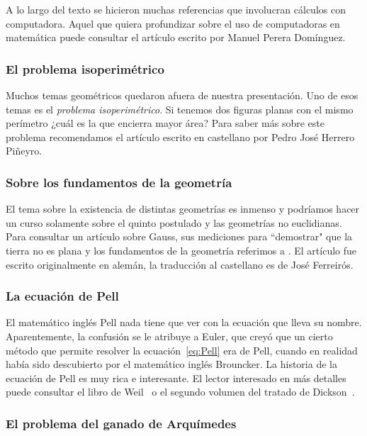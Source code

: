 A lo largo del texto se hicieron muchas referencias que involucran cálculos
con computadora. Aquel que quiera profundizar sobre 
el uso de computadoras en matemática puede consultar
el artículo \cite{pd_ENIAC} escrito por Manuel Perera Domínguez. 

\subsubsection*{El problema isoperimétrico}

Muchos temas geométricos quedaron afuera de nuestra presentación. Uno de esos
temas es el \emph{problema isoperimétrico}. Si tenemos dos figuras planas
con el mismo perímetro ¿cuál es la que encierra mayor área? Para 
saber más sobre este problema 
recomendamos el artículo \cite{hp_isoperimetric} 
escrito en castellano por Pedro Jos{\'e} Herrero Pi{\~n}eyro. 

\subsubsection*{Sobre los fundamentos de la geometría}

El tema sobre la existencia de distintas geometrías es inmenso y podríamos
hacer un curso solamente sobre el quinto postulado y las geometrías no euclidianas. 
Para consultar un 
artículo sobre Gauss, sus mediciones para ``demostrar" que la tierra
no es plana y los fundamentos de la geometría
referimos a \cite{scholz_triangulos}. El artículo fue escrito originalmente 
en alemán, la traducción al castellano
es de José Ferreirós.

\subsubsection*{La ecuación de Pell}

El matemático inglés Pell nada tiene que ver con la ecuación que lleva su nombre.
Aparentemente, la confusión se le atribuye a Euler, 
que creyó que un cierto método que permite
resolver la ecuación~\eqref{eq:Pell} era de Pell, 
cuando en realidad había sido descubierto
por el matemático inglés Brouncker.  La historia de la ecuación de Pell es muy
rica e interesante. El lector interesado en más detalles puede consultar el
libro de Weil~\cite{MR734177} o el segundo volumen del tratado de
Dickson~\cite{MR0245500}.

\subsubsection*{El problema del ganado de Arquímedes}

